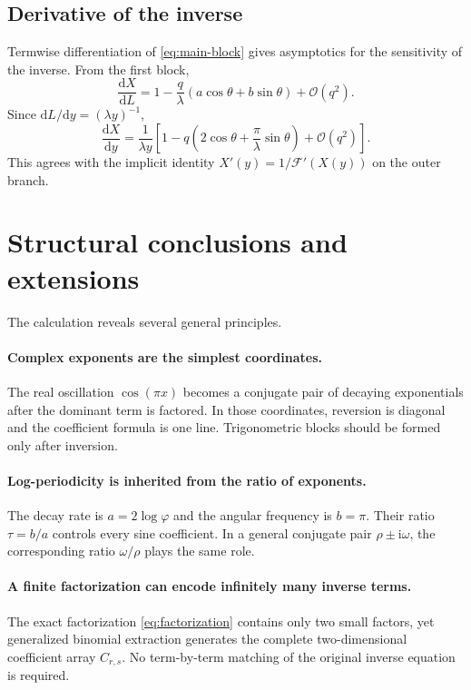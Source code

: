 \documentclass[11pt,oneside]{article}
\numberwithin{equation}{section}
\newcommand{\ii}{\mathrm{i}}
\newcommand{\dd}{\mathrm{d}}
\newcommand{\cF}{\mathcal{F}}
\newcommand{\bigO}{\mathcal{O}}
\begin{document}
\subsection{Derivative of the inverse}

Termwise differentiation of \cref{eq:main-block} gives asymptotics for the
sensitivity of the inverse.  From the first block,
\begin{equation}
  \frac{\dd X}{\dd L}
  =1-\frac q\lambda\left(a\cos\theta+b\sin\theta\right)+\bigO(q^2).
\end{equation}
Since \(\dd L/\dd y=(\lambda y)^{-1}\),
\begin{equation}
  \boxed{
  \frac{\dd X}{\dd y}
  =\frac1{\lambda y}\left[
   1-q\left(2\cos\theta+\frac\pi\lambda\sin\theta\right)
   +\bigO(q^2)
  \right].
  }
  \label{eq:inverse-derivative}
\end{equation}
This agrees with the implicit identity \(X'(y)=1/\cF'(X(y))\) on the outer
branch.

\section{Structural conclusions and extensions}
\label{sec:consequences}

The calculation reveals several general principles.

\paragraph{Complex exponents are the simplest coordinates.}
The real oscillation \(\cos(\pi x)\) becomes a conjugate pair of decaying
exponentials after the dominant term is factored.  In those coordinates,
reversion is diagonal and the coefficient formula is one line.  Trigonometric
blocks should be formed only after inversion.

\paragraph{Log-periodicity is inherited from the ratio of exponents.}
The decay rate is \(a=2\log\varphi\) and the angular frequency is \(b=\pi\).
Their ratio \(\tau=b/a\) controls every sine coefficient.  In a general
conjugate pair \(\rho\pm\ii\omega\), the corresponding ratio
\(\omega/\rho\) plays the same role.

\paragraph{A finite factorization can encode infinitely many inverse terms.}
The exact factorization \cref{eq:factorization} contains only two small factors,
yet generalized binomial extraction generates the complete two-dimensional
coefficient array \(C_{r,s}\).  No term-by-term matching of the original
inverse equation is required.
\end{document}
